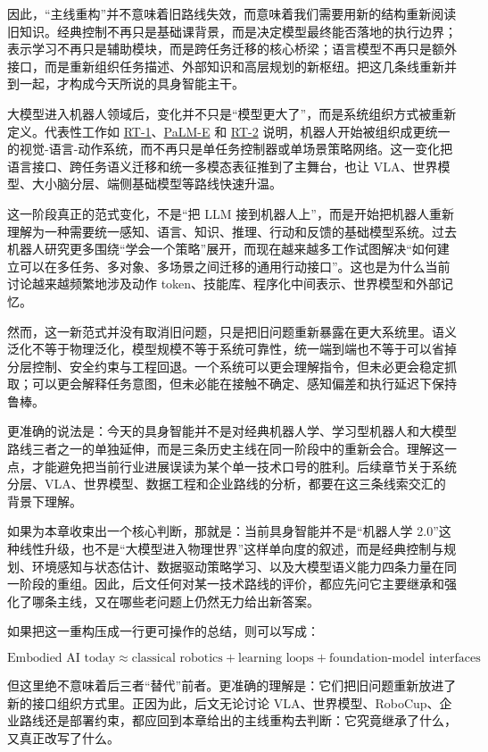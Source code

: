 因此，“主线重构”并不意味着旧路线失效，而意味着我们需要用新的结构重新阅读旧知识。经典控制不再只是基础课背景，而是决定模型最终能否落地的执行边界；表示学习不再只是辅助模块，而是跨任务迁移的核心桥梁；语言模型不再只是额外接口，而是重新组织任务描述、外部知识和高层规划的新枢纽。把这几条线重新并到一起，才构成今天所说的具身智能主干。

大模型进入机器人领域后，变化并不只是“模型更大了”，而是系统组织方式被重新定义。代表性工作如 \href{https://arxiv.org/abs/2212.06817}{RT-1}、\href{https://arxiv.org/abs/2303.03378}{PaLM-E} 和 \href{https://arxiv.org/abs/2307.15818}{RT-2} 说明，机器人开始被组织成更统一的视觉-语言-动作系统，而不再只是单任务控制器或单场景策略网络。这一变化把语言接口、跨任务语义迁移和统一多模态表征推到了主舞台，也让 VLA、世界模型、大小脑分层、端侧基础模型等路线快速升温。

这一阶段真正的范式变化，不是“把 LLM 接到机器人上”，而是开始把机器人重新理解为一种需要统一感知、语言、知识、推理、行动和反馈的基础模型系统。过去机器人研究更多围绕“学会一个策略”展开，而现在越来越多工作试图解决“如何建立可以在多任务、多对象、多场景之间迁移的通用行动接口”。这也是为什么当前讨论越来越频繁地涉及动作 token、技能库、程序化中间表示、世界模型和外部记忆。

然而，这一新范式并没有取消旧问题，只是把旧问题重新暴露在更大系统里。语义泛化不等于物理泛化，模型规模不等于系统可靠性，统一端到端也不等于可以省掉分层控制、安全约束与工程回退。一个系统可以更会理解指令，但未必更会稳定抓取；可以更会解释任务意图，但未必能在接触不确定、感知偏差和执行延迟下保持鲁棒。

更准确的说法是：今天的具身智能并不是对经典机器人学、学习型机器人和大模型路线三者之一的单独延伸，而是三条历史主线在同一阶段中的重新会合。理解这一点，才能避免把当前行业进展误读为某个单一技术口号的胜利。后续章节关于系统分层、VLA、世界模型、数据工程和企业路线的分析，都要在这三条线索交汇的背景下理解。

如果为本章收束出一个核心判断，那就是：当前具身智能并不是“机器人学 2.0”这种线性升级，也不是“大模型进入物理世界”这样单向度的叙述，而是经典控制与规划、环境感知与状态估计、数据驱动策略学习、以及大模型语义能力四条力量在同一阶段的重组。因此，后文任何对某一技术路线的评价，都应先问它主要继承和强化了哪条主线，又在哪些老问题上仍然无力给出新答案。

如果把这一重构压成一行更可操作的总结，则可以写成：

\begingroup
\scriptsize
\begin{equation*}
\text{Embodied AI today}
\approx
\text{classical robotics}
+ \text{learning loops}
+ \text{foundation-model interfaces}
\end{equation*}
\endgroup

但这里绝不意味着后三者“替代”前者。更准确的理解是：它们把旧问题重新放进了新的接口组织方式里。正因为此，后文无论讨论 VLA、世界模型、RoboCup、企业路线还是部署约束，都应回到本章给出的主线重构去判断：它究竟继承了什么，又真正改写了什么。
